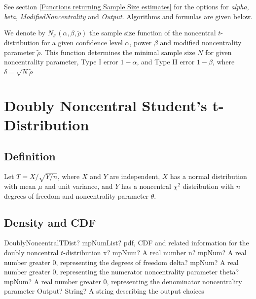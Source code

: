 \vspace{0.3cm}
See section \ref{Functions returning Sample Size estimates} for the options for  {\itshape\sffamily alpha}, {\itshape\sffamily beta}, {\itshape\sffamily ModifiedNoncentrality} and {\itshape\sffamily Output}. Algorithms and formulas are given below.

\vspace{0.3cm}
We denote by $N_{t'}\left(\alpha, \beta, \widetilde{\rho} \right)$  the sample size function of the noncentral $t$-distribution for a given confidence level $\alpha$, power $\beta$ and modified noncentrality parameter $\widetilde{\rho}$. This function determines the minimal sample size $N$ for given noncentrality parameter, Type I error $1-\alpha$, and Type II error $1-\beta$, where  $\delta = \sqrt{N}\widetilde{\rho}$ 










\newpage
\section{Doubly Noncentral Student's t-Distribution}
\label{DoublyNoncentraltDistribution}


\subsection{Definition}
\label{DoublyNoncentraltDistributionDefinition}

Let $T=X/\sqrt{Y/n}$, where $X$ and $Y$ are independent, $X$ has a normal distribution with mean $\mu$ and unit variance, and $Y$ has a noncentral $\chi^2$ distribution with $n$ degrees of freedom and noncentrality parameter $\theta$.



\subsection{Density and CDF}

\begin{mpFunctionsExtract}
	\mpFunctionFiveNotImplemented
	{DoublyNoncentralTDist? mpNumList? pdf, CDF and related information for the doubly noncentral $t$-distribution}
	{x? mpNum? A real number}
	{n? mpNum? A real number greater 0, representing the degrees of freedom}
	{delta? mpNum? A real number greater 0, representing the numerator noncentrality parameter}
	{theta? mpNum? A real number greater 0, representing the denominator noncentrality parameter}
	{Output? String? A string describing the output choices}
\end{mpFunctionsExtract}



